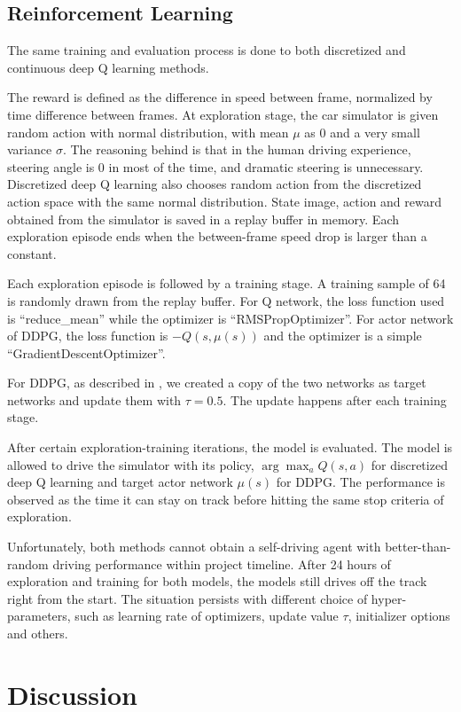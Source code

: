 \documentclass[a4paper]{article}
\begin{document}
\subsection{Reinforcement Learning}

The same training and evaluation process is done to both discretized and continuous deep Q learning methods.

The reward is defined as the difference in speed between frame, normalized by time difference between frames. At exploration stage, the car simulator is given random action with normal distribution, with mean $\mu$ as 0 and a very small variance $\sigma$. The reasoning behind is that in the human driving experience, steering angle is 0 in most of the time, and dramatic steering is unnecessary. Discretized deep Q learning also chooses random action from the discretized action space with the same normal distribution. State image, action and reward obtained from the simulator is saved in a replay buffer in memory. Each exploration episode ends when the between-frame speed drop is larger than a constant.

Each exploration episode is followed by a training stage. A training sample of 64 is randomly drawn from the replay buffer. For Q network, the loss function used is ``reduce\_mean'' while the optimizer is ``RMSPropOptimizer''. For actor network of DDPG, the loss function is $-Q(s,\mu(s))$ and the optimizer is a simple ``GradientDescentOptimizer''.

For DDPG, as described in \cite{lillicrap2015continuous}, we created a copy of the two networks as target networks and update them with $\tau = 0.5$. The update happens after each training stage.

After certain exploration-training iterations, the model is evaluated. The model is allowed to drive the simulator with its policy, $\arg\max_aQ(s,a)$ for discretized deep Q learning and target actor network $\mu(s)$ for DDPG. The performance is observed as the time it can stay on track before hitting the same stop criteria of exploration. 

Unfortunately, both methods cannot obtain a self-driving agent with better-than-random driving performance within project timeline. After 24 hours of exploration and training for both models, the models still drives off the track right from the start. The situation persists with different choice of hyper-parameters, such as learning rate of optimizers, update value $\tau$, initializer options and others.

\section{Discussion}
\end{document}
